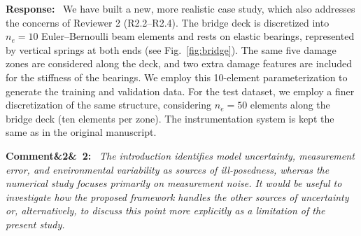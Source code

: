 \documentclass[11pt]{article}
\newenvironment{rcomment}[1]{\par\bigskip\noindent\textbf{Comment\ifx&#1&\else\ #1\fi:}\ \itshape}{\par}
\newenvironment{response}{\par\smallskip\noindent\color{resp}\textbf{Response:}\ }{\par}
\newcommand{\z}{\mathbf{z}}
\begin{document}
\begin{response}
We have  built a new, more realistic case study, which also addresses the concerns of Reviewer 2 (R2.2--R2.4). 
The bridge deck is discretized into $n_{e}  = 10$  Euler--Bernoulli beam elements and rests on elastic bearings, represented by vertical springs at both ends (see Fig.~\ref{fig:bridge}). 
The same five damage zones are considered along the deck, and two extra damage features are included for the stiffness of the bearings.  
We employ this 10-element parameterization to generate the training and validation data.
For the test dataset, we employ a finer discretization of the same structure, considering $n_{e} = 50$ elements along the bridge deck (ten elements per zone).
The instrumentation system is kept the same as in the original manuscript. 


\end{response}

\begin{rcomment}{2}
The introduction identifies model uncertainty, measurement error, and environmental variability as sources of
ill-posedness, whereas the numerical study focuses primarily on measurement noise. It would be useful to investigate how
the proposed framework handles the other sources of uncertainty or, alternatively, to discuss this point more explicitly
as a limitation of the present study.
\end{rcomment}
\end{document}
